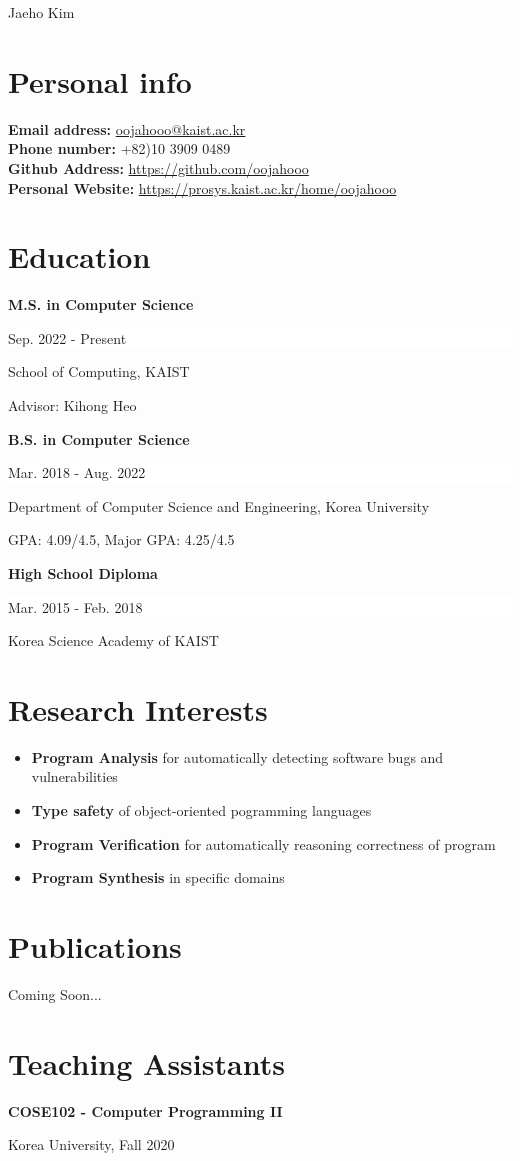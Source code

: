 \documentclass[paper=a4,fontsize=11pt]{scrartcl} %
\newlength{\spacebox}
\newcommand{\MyName}[1]{ %
                \Huge \hfill #1
                \par \normalsize \normalfont}
\newcommand{\NewPart}[1]{\section*{{#1}}}
\newcommand{\PersonalEntry}[2]{
		\noindent\hangindent=2em\hangafter=0 %
		\parbox{\spacebox}{        %
		\textit{#1}}		       %
		\hspace{1.5em} #2 \par}    %
\newcommand{\SkillsEntry}[2]{      %
		\noindent\hangindent=2em\hangafter=0 %
		\parbox{\spacebox}{        %
		\textit{#1}}			   %
		\hspace{1.5em} #2 \par}    %
\newcommand{\EducationEntry}[4]{
		\noindent \textbf{#1} \hfill      %
		\colorbox{White}{%
			\parbox{5cm}{%
			\hfill\color{Black}#2}} \par  %
		\noindent #3 \par        %
		\noindent\small #4 %
		\normalsize \par}
\begin{document}

\MyName{Jaeho Kim}



\NewPart{Personal info}{}
\textbf{Email address:} \href{mailto:oojahooo@kaist.ac.kr}{oojahooo@kaist.ac.kr} \\
\textbf{Phone number:} +82)10 3909 0489  \\
\textbf{Github Address:} \href{https://github.com/oojahooo}{https://github.com/oojahooo} \\
\textbf{Personal Website:} \href{https://prosys.kaist.ac.kr/home/oojahooo}{https://prosys.kaist.ac.kr/home/oojahooo}

\NewPart{Education}{}

\EducationEntry{M.S. in Computer Science}{Sep. 2022 - Present}{School of Computing, KAIST}{
	Advisor: Kihong Heo
}

\EducationEntry{B.S. in Computer Science}{Mar. 2018 - Aug. 2022}{Department of Computer Science and Engineering, Korea University}{
	GPA: 4.09/4.5, Major GPA: 4.25/4.5 \\
}

\EducationEntry{High School Diploma}{Mar. 2015 - Feb. 2018}{Korea Science Academy of KAIST}{}

\NewPart{Research Interests}{}

\begin{itemize}
	\item \textbf{Program Analysis} for automatically detecting software bugs and vulnerabilities
	\item \textbf{Type safety} of object-oriented pogramming languages
	\item \textbf{Program Verification} for automatically reasoning correctness of program
	\item \textbf{Program Synthesis} in specific domains
\end{itemize}


\NewPart{Publications}{}

Coming Soon...

\newpage

\NewPart{Teaching Assistants}{}

\EducationEntry{COSE102 - Computer Programming II}{}{Korea University, Fall 2020}{}



\end{document}
